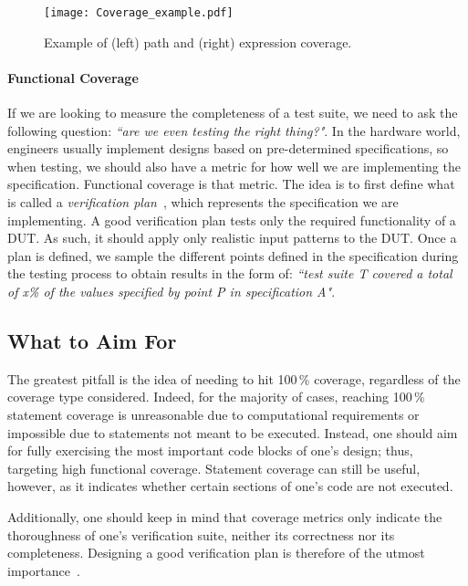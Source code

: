 \documentclass[conference]{IEEEtran}
\begin{document}
\begin{figure}
    \centering
    \texttt{[image: Coverage\_example.pdf]}
    \caption{Example of (left) path and (right) expression coverage.}
\label{fig:expr}
\end{figure}

\paragraph{Functional Coverage} If we are looking to measure the completeness of a test suite, we need to ask the following question: \textit{``are we even testing the right thing?"}. 
In the hardware world, engineers usually implement designs based on pre-determined specifications, so when testing, we should also have a metric for how well we are implementing the specification. 
Functional coverage is that metric. 
The idea is to first define what is called a \textit{verification plan}~\cite{spear2008systemverilog}, which represents the specification we are implementing. 
A good verification plan tests only the required functionality of a DUT. As such, it should apply only 
realistic input patterns to the DUT.
Once a plan is defined, we sample the different points defined in the specification during the testing process to obtain results in the form of: \textit{``test suite T covered a total of x\% of the values specified by point P in specification A"}. 

\subsection{What to Aim For}
The greatest pitfall is the idea of needing to hit 100\,\% coverage, regardless of the coverage type considered. Indeed, for the majority of cases, reaching 100\,\% statement coverage is unreasonable due to computational requirements or impossible due to statements not meant to be executed. Instead, one should aim for fully exercising the most important code blocks of one's design; thus, targeting high functional coverage. Statement coverage can still be useful, however, as it indicates whether certain sections of one's code are not executed. 

Additionally, one should keep in mind that coverage metrics only indicate the thoroughness of one's verification suite, neither its correctness nor its completeness. Designing a good verification plan is therefore of the utmost importance~\cite{hdlverify}.
\end{document}
